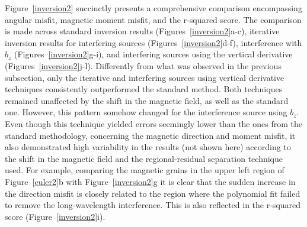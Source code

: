 Figure~\ref{inversion2} succinctly presents a comprehensive comparison encompassing angular misfit, magnetic moment misfit, and the r-squared score. The comparison is made across standard inversion results (Figures~\ref{inversion2}a-c), iterative inversion results for interfering sources (Figures~\ref{inversion2}d-f), interference with $b_z$ (Figures~\ref{inversion2}g-i), and interfering sources using the vertical derivative (Figures~\ref{inversion2}j-l). Differently from what was observed in the previous subsection, only the iterative and interfering sources using vertical derivative techniques consistently outperformed the standard method. Both techniques remained unaffected by the shift in the magnetic field, as well as the standard one. However, this pattern somehow changed for the interference source using $b_z$. Even though this technique yielded errors seemingly lower than the ones from the standard methodology, concerning the magnetic direction and moment misfit, it also demonstrated high variability in the results (not shown here) according to the shift in the magnetic field and the regional-residual separation technique used. For example, comparing the magnetic grains in the upper left region of Figure~\ref{euler2}b with Figure~\ref{inversion2}g it is clear that the sudden increase in the direction misfit is closely related to the region where the polynomial fit failed to remove the long-wavelength interference. This is also reflected in the r-squared score (Figure~\ref{inversion2}i).

